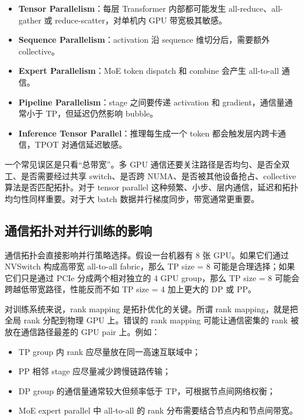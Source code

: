 \begin{itemize}
  \item \textbf{Tensor Parallelism}：每层 Transformer 内部都可能发生 all-reduce、all-gather 或 reduce-scatter，对单机内 GPU 带宽极其敏感。
  \item \textbf{Sequence Parallelism}：activation 沿 sequence 维切分后，需要额外 collective。
  \item \textbf{Expert Parallelism}：MoE token dispatch 和 combine 会产生 all-to-all 通信。
  \item \textbf{Pipeline Parallelism}：stage 之间要传递 activation 和 gradient，通信量通常小于 TP，但延迟仍然影响 bubble。
  \item \textbf{Inference Tensor Parallel}：推理每生成一个 token 都会触发层内跨卡通信，TPOT 对通信延迟敏感。
\end{itemize}

一个常见误区是只看“总带宽”。多 GPU 通信还要关注路径是否均匀、是否全双工、是否需要经过共享 switch、是否跨 NUMA、是否被其他设备抢占、collective 算法是否匹配拓扑。对于 tensor parallel 这种频繁、小步、层内通信，延迟和拓扑均匀性同样重要。对于大 batch 数据并行梯度同步，带宽通常更重要。

\subsection{通信拓扑对并行训练的影响}
\label{subsec:topology-impact-training}

通信拓扑会直接影响并行策略选择。假设一台机器有 8 张 GPU。如果它们通过 NVSwitch 构成高带宽 all-to-all fabric，那么 TP size = 8 可能是合理选择；如果它们只是通过 PCIe 分成两个相对独立的 4 GPU group，那么 TP size = 8 可能会跨越低带宽路径，性能反而不如 TP size = 4 加上更大的 DP 或 PP。

对训练系统来说，rank mapping 是拓扑优化的关键。所谓 rank mapping，就是把全局 rank 分配到物理 GPU 上。错误的 rank mapping 可能让通信密集的 rank 被放在通信路径最差的 GPU pair 上。例如：

\begin{itemize}
  \item TP group 内 rank 应尽量放在同一高速互联域中；
  \item PP 相邻 stage 应尽量减少跨慢链路传输；
  \item DP group 的通信量通常较大但频率低于 TP，可根据节点间网络权衡；
  \item MoE expert parallel 中 all-to-all 的 rank 分布需要结合节点内和节点间带宽。
\end{itemize}

